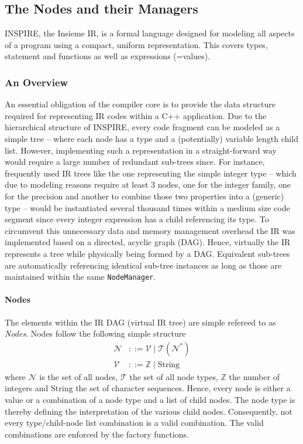 \subsection{The Nodes and their Managers}
\label{sec:Compiler.Core.NodesAndManagers}
INSPIRE, the Insieme IR, is a formal language designed for modeling all aspects
of a program using a compact, uniform representation. This covers types,
statement and functions as well as expressions (=values).

\subsubsection{An Overview}
An essential obligation of the compiler core is to provide the data structure
required for representing IR codes within a C++ application. Due to the
hierarchical structure of INSPIRE, every code fragment can be modeled as a
simple tree -- where each node has a type and a (potentially) variable length
child list. However, implementing such a representation in a straight-forward
way would require a large number of redundant sub-trees since. For instance,
frequently used IR trees like the one representing the simple integer type --
which due to modeling reasons require at least 3 nodes, one for the integer
family, one for the precision and another to combine those two properties into a
(generic) type -- would be instantiated several thousand times within a medium
size code segment since every integer expression has a child referencing its
type. To circumvent this unnecessary data and memory management overhead the
IR was implemented based on a directed, acyclic graph (DAG). Hence, virtually
the IR represents a tree while physically being formed by a DAG. Equivalent
sub-trees are automatically referencing identical sub-tree instances as long as
those are maintained within the same \texttt{NodeManager}.

\paragraph{Nodes}  The elements within the IR DAG (virtual IR
tree) are simple refereed to as \textit{Nodes}. Nodes follow the following
simple structure
\begin{align}
	\label{eq:Compiler.Core.NodeDef}
	\mathcal{N} &::= \mathcal{V}\;|\;\mathcal{T}(\mathcal{N}^*) \\
	\mathcal{V} &::= \mathbb{Z}\;|\;\text{String}
\end{align}
where $\mathcal{N}$ is the set of all nodes, $\mathcal{T}$ the set of all node
types, $\mathbb{Z}$ the number of integers and $\text{String}$ the set of
character sequences. Hence, every node is either a value or a combination of a
node type and a list of child nodes. The node type is thereby defining the
interpretation of the various child nodes. Consequently, not every
type/child-node list combination is a valid combination. The valid combinations
are enforced by the factory functions.

